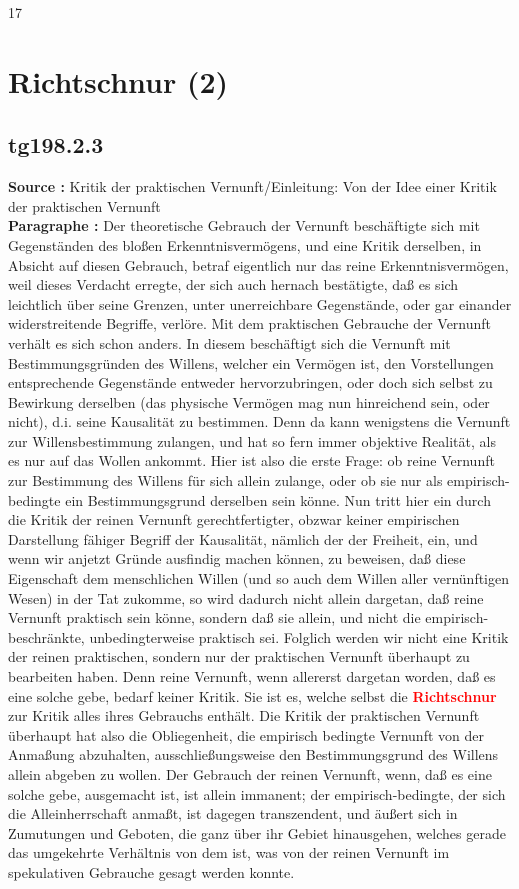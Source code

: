 \documentclass[a4paper,12pt,twoside]{book}
\newcommand{\match}[1]{\textcolor{red}{\textbf{#1}}}
\newcommand{\unnumberedsection}[1]{
	\section*{#1}
	\addcontentsline{toc}{section}{#1}
	\markright{#1}
}
\begin{document}
	
	17
	
	
	
	\unnumberedsection{Richtschnur (2)} 
	\subsection*{tg198.2.3} 
	\textbf{Source : }Kritik der praktischen Vernunft/Einleitung: Von der Idee einer Kritik der praktischen Vernunft\\  
	
	\noindent\textbf{Paragraphe : }Der theoretische Gebrauch der Vernunft beschäftigte sich mit Gegenständen des bloßen Erkenntnisvermögens, und eine Kritik derselben, in Absicht auf diesen Gebrauch, betraf eigentlich nur das reine Erkenntnisvermögen, weil dieses Verdacht erregte, der sich auch hernach bestätigte, daß es sich leichtlich über seine Grenzen, unter unerreichbare Gegenstände, oder gar einander widerstreitende Begriffe, verlöre. Mit dem praktischen Gebrauche der Vernunft verhält es sich schon anders. In diesem beschäftigt sich die Vernunft mit Bestimmungsgründen des Willens, welcher ein Vermögen ist, den Vorstellungen entsprechende Gegenstände entweder hervorzubringen, oder doch sich selbst zu Bewirkung derselben (das physische Vermögen mag nun hinreichend sein, oder nicht), d.i. seine Kausalität zu bestimmen. Denn da kann wenigstens die Vernunft zur Willensbestimmung zulangen, und hat so fern immer objektive Realität, als es nur auf das Wollen ankommt. Hier ist also die erste Frage: ob reine Vernunft zur Bestimmung des Willens für sich allein zulange, oder ob sie nur als empirisch- bedingte ein Bestimmungsgrund derselben sein könne. Nun tritt hier ein durch die Kritik der reinen Vernunft gerechtfertigter, obzwar keiner empirischen Darstellung fähiger Begriff der Kausalität, nämlich der der Freiheit, ein, und wenn wir anjetzt Gründe ausfindig machen können, zu beweisen, daß diese Eigenschaft dem menschlichen Willen (und so auch dem Willen aller vernünftigen Wesen) in der Tat zukomme, so wird dadurch nicht allein dargetan, daß reine Vernunft praktisch sein könne, sondern daß sie allein, und nicht die empirisch-beschränkte, unbedingterweise praktisch sei. Folglich werden wir nicht eine Kritik der reinen praktischen, sondern nur der praktischen Vernunft überhaupt zu bearbeiten haben. Denn reine Vernunft, wenn allererst dargetan worden, daß es eine solche gebe, bedarf keiner Kritik. Sie ist es, welche selbst die \match{Richtschnur} zur Kritik alles ihres Gebrauchs enthält. Die Kritik der praktischen Vernunft überhaupt  hat also die Obliegenheit, die empirisch bedingte Vernunft von der Anmaßung abzuhalten, ausschließungsweise den Bestimmungsgrund des Willens allein abgeben zu wollen. Der Gebrauch der reinen Vernunft, wenn, daß es eine solche gebe, ausgemacht ist, ist allein immanent; der empirisch-bedingte, der sich die Alleinherrschaft anmaßt, ist dagegen transzendent, und äußert sich in Zumutungen und Geboten, die ganz über ihr Gebiet hinausgehen, welches gerade das umgekehrte Verhältnis von dem ist, was von der reinen Vernunft im spekulativen Gebrauche gesagt werden konnte. 
	
\end{document}
